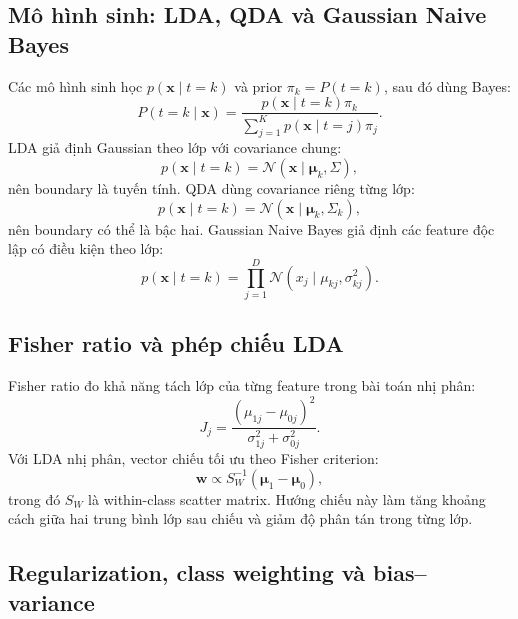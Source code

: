 \documentclass[12pt,a4paper]{article}
\begin{document}
\subsection{Mô hình sinh: LDA, QDA và Gaussian Naive Bayes}

Các mô hình sinh học $p(\mathbf{x}\mid t=k)$ và prior $\pi_k=P(t=k)$, sau đó dùng
Bayes:
\begin{equation}
  P(t=k\mid \mathbf{x})
  =\frac{p(\mathbf{x}\mid t=k)\pi_k}
  {\sum_{j=1}^{K}p(\mathbf{x}\mid t=j)\pi_j}.
  \label{eq:cls_bayes_rule}
\end{equation}
LDA giả định Gaussian theo lớp với covariance chung:
\begin{equation}
  p(\mathbf{x}\mid t=k)=\mathcal{N}(\mathbf{x}\mid\boldsymbol{\mu}_k,\Sigma),
  \label{eq:cls_lda_assumption}
\end{equation}
nên boundary là tuyến tính. QDA dùng covariance riêng từng lớp:
\begin{equation}
  p(\mathbf{x}\mid t=k)=\mathcal{N}(\mathbf{x}\mid\boldsymbol{\mu}_k,\Sigma_k),
  \label{eq:cls_qda_assumption}
\end{equation}
nên boundary có thể là bậc hai. Gaussian Naive Bayes giả định các feature độc
lập có điều kiện theo lớp:
\begin{equation}
  p(\mathbf{x}\mid t=k)=\prod_{j=1}^{D}\mathcal{N}(x_j\mid\mu_{kj},\sigma_{kj}^{2}).
  \label{eq:cls_gnb_assumption}
\end{equation}

\subsection{Fisher ratio và phép chiếu LDA}

Fisher ratio đo khả năng tách lớp của từng feature trong bài toán nhị phân:
\begin{equation}
  J_j=\frac{(\mu_{1j}-\mu_{0j})^{2}}{\sigma_{1j}^{2}+\sigma_{0j}^{2}}.
  \label{eq:cls_fisher_ratio}
\end{equation}
Với LDA nhị phân, vector chiếu tối ưu theo Fisher criterion:
\begin{equation}
  \mathbf{w}\propto S_W^{-1}(\boldsymbol{\mu}_1-\boldsymbol{\mu}_0),
  \label{eq:cls_lda_projection}
\end{equation}
trong đó $S_W$ là within-class scatter matrix. Hướng chiếu này làm tăng khoảng
cách giữa hai trung bình lớp sau chiếu và giảm độ phân tán trong từng lớp.

\subsection{Regularization, class weighting và bias--variance}
\end{document}

